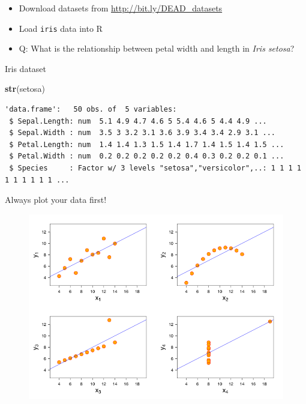 \documentclass[10pt,ignorenonframetext,]{beamer}
\newenvironment{Shaded}{\begin{snugshade}}{\end{snugshade}}
\newcommand{\KeywordTok}[1]{\textcolor[rgb]{0.13,0.29,0.53}{\textbf{{#1}}}}
\newcommand{\NormalTok}[1]{{#1}}
\begin{document}
\begin{frame}[fragile]

\begin{itemize}[<+->]
\item
  Download datasets from \url{http://bit.ly/DEAD_datasets}
\item
  Load \texttt{iris} data into R
\item
  Q: What is the relationship between petal width and length in
  \emph{Iris setosa}?
\end{itemize}

\end{frame}

\begin{frame}[fragile]{Iris dataset}

\begin{Shaded}
\begin{Highlighting}[]
\KeywordTok{str}\NormalTok{(setosa)}
\end{Highlighting}
\end{Shaded}

\begin{verbatim}
'data.frame':   50 obs. of  5 variables:
 $ Sepal.Length: num  5.1 4.9 4.7 4.6 5 5.4 4.6 5 4.4 4.9 ...
 $ Sepal.Width : num  3.5 3 3.2 3.1 3.6 3.9 3.4 3.4 2.9 3.1 ...
 $ Petal.Length: num  1.4 1.4 1.3 1.5 1.4 1.7 1.4 1.5 1.4 1.5 ...
 $ Petal.Width : num  0.2 0.2 0.2 0.2 0.2 0.4 0.3 0.2 0.2 0.1 ...
 $ Species     : Factor w/ 3 levels "setosa","versicolor",..: 1 1 1 1 1 1 1 1 1 1 ...
\end{verbatim}

\end{frame}

\begin{frame}{Always plot your data first!}

\begin{figure}[htbp]
\centering
\includegraphics{images/anscombe.png}
\caption{}
\end{figure}

\end{frame}
\end{document}
